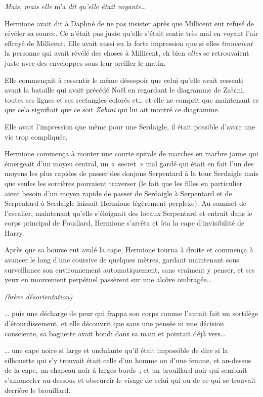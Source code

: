 \emph{Mais, mais elle} m'a \emph{dit qu'elle était voyante…}

Hermione avait dit à Daphné de ne pas insister après que Millicent eut refusé de révéler sa source. Ce n'était pas juste qu'elle s'était sentie très mal en voyant l'air effrayé de Millicent. Elle avait aussi eu la forte impression que si elles \emph{trouvaient} la personne qui avait révélé des choses à Millicent, eh bien \emph{elles} se retrouvaient juste avec des enveloppes sous leur oreiller le matin.

Elle commençait à ressentir le même désespoir que celui qu'elle avait ressenti avant la bataille qui avait précédé Noël en regardant le diagramme de Zabini, toutes ses lignes et ses rectangles colorés et… et elle ne comprit que maintenant ce que cela signifiait que ce soit \emph{Zabini} qui lui ait montré ce diagramme.

Elle avait l'impression que même pour une Serdaigle, il était possible d'avoir une vie trop compliquée.

Hermione commença à monter une courte spirale de marches en marbre jaune qui émergeait d'un moyeu central, un «~secret~» mal gardé qui était en fait l'un des moyens les plus rapides de passer des donjons Serpentard à la tour Serdaigle mais que seules les sorcières pouvaient traverser (le fait que les filles en particulier aient besoin d'un moyen rapide de passer de Serdaigle à Serpentard et de Serpentard à Serdaigle laissait Hermione légèrement perplexe). Au sommet de l'escalier, maintenant qu'elle s'éloignait des locaux Serpentard et entrait dans le corps principal de Poudlard, Hermione s'arrêta et ôta la cape d'invisibilité de Harry.

Après que sa bourse eut avalé la cape, Hermione tourna à droite et commença à avancer le long d'une coursive de quelques mètres, gardant maintenant sous surveillance son environnement automatiquement, sans vraiment y penser, et ses yeux en mouvement perpétuel passèrent sur une alcôve ombragée…

\emph{(brève désorientation)}

… puis une décharge de peur qui frappa son corps comme l'aurait fait un sortilège d'étourdissement, et elle découvrit que sans une pensée ni une décision consciente, sa baguette avait bondi dans sa main et pointait déjà vers…

… une cape noire si large et ondulante qu'il était impossible de dire si la silhouette qui s'y trouvait était celle d'un homme ou d'une femme, et au-dessus de la cape, un chapeau noir à larges bords~; et un brouillard noir qui semblait s'amonceler au-dessous et obscurcir le visage de celui qui ou de ce qui se trouvait derrière le brouillard.

